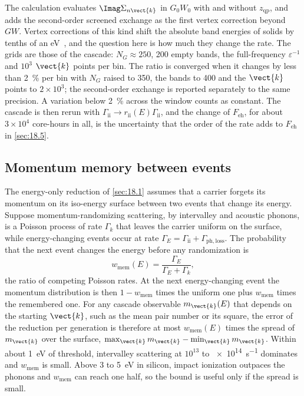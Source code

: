 The calculation evaluates $\Imag\Sigma_{n\vect{k}}$ in $G_0W_0$ with and without $z_{\mathrm{qp}}$, and adds the second-order screened exchange as the first vertex correction beyond $GW$. Vertex corrections of this kind shift the absolute band energies of solids by tenths of an eV~\cite{grueneis2014ionization}, and the question here is how much they change the rate. The grids are those of the cascade: $N_G \approx 250$, 200 empty bands, the full-frequency $\varepsilon^{-1}$ and $10^3$ $\vect{k}$ points per bin. The ratio is converged when it changes by less than \SI{2}{\percent} per bin with $N_G$ raised to 350, the bands to 400 and the $\vect{k}$ points to $2\times10^3$; the second-order exchange is reported separately to the same precision. A variation below \SI{2}{\percent} across the window counts as constant. The cascade is then rerun with $\varGamma_{\mathrm{ii}} \to r_{\mathrm{ii}}(E)\varGamma_{\mathrm{ii}}$, and the change of $F_{\mathrm{eh}}$, for about $3\times10^4$ core-hours in all, is the uncertainty that the order of the rate adds to $F_{\mathrm{eh}}$ in \cref{sec:18.5}.

\subsection{Momentum memory between events}

The energy-only reduction of \cref{sec:18.1} assumes that a carrier forgets its momentum on its iso-energy surface between two events that change its energy. Suppose momentum-randomizing scattering, by intervalley and acoustic phonons, is a Poisson process of rate $\varGamma_k$ that leaves the carrier uniform on the surface, while energy-changing events occur at rate $\varGamma_E = \varGamma_{\mathrm{ii}} + \varGamma_{\mathrm{ph,loss}}$. The probability that the next event changes the energy before any randomization is
\begin{equation}
  w_{\mathrm{mem}}(E) = \frac{\varGamma_E}{\varGamma_E + \varGamma_k} ,
  \label{eq:E.24-wmem}
\end{equation}
the ratio of competing Poisson rates. At the next energy-changing event the momentum distribution is then $1 - w_{\mathrm{mem}}$ times the uniform one plus $w_{\mathrm{mem}}$ times the remembered one. For any cascade observable $m_{\vect{k}}(E)$ that depends on the starting $\vect{k}$, such as the mean pair number or its square, the error of the reduction per generation is therefore at most $w_{\mathrm{mem}}(E)$ times the spread of $m_{\vect{k}}$ over the surface, $\max_{\vect{k}}m_{\vect{k}} - \min_{\vect{k}}m_{\vect{k}}$. Within about \SI{1}{eV} of threshold, intervalley scattering at $10^{13}$ to \SI{e14}{s^{-1}} dominates and $w_{\mathrm{mem}}$ is small. Above 3 to \SI{5}{eV} in silicon, impact ionization outpaces the phonons and $w_{\mathrm{mem}}$ can reach one half, so the bound is useful only if the spread is small.

